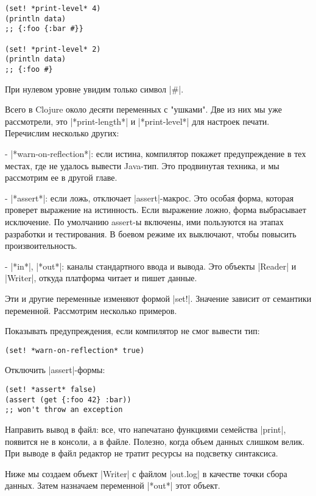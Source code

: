 \begin{verbatim}
(set! *print-level* 4)
(println data)
;; {:foo {:bar #}}

(set! *print-level* 2)
(println data)
;; {:foo #}
\end{verbatim}

При нулевом уровне увидим только символ \spverb|#|.

Всего в Clojure около десяти переменных с "ушками". Две из них мы уже
рассмотрели, это \spverb|*print-length*| и \spverb|*print-level*| для настроек
печати. Перечислим несколько других:

- \spverb|*warn-on-reflection*|: если истина, компилятор покажет предупреждение в тех
  местах, где не удалось вывести Java-тип. Это продвинутая техника, и мы
  рассмотрим ее в другой главе.

- \spverb|*assert*|: если ложь, отключает \spverb|assert|-макрос. Это особая форма, которая
  проверет выражение на истинность. Если выражение ложно, форма выбрасывает
  исключение. По умолчанию assert-ы включены, ими пользуются на этапах
  разработки и тестирования. В боевом режиме их выключают, чтобы повысить
  произвоительность.

- \spverb|*in*|, \spverb|*out*|: каналы стандартного ввода и вывода. Это объекты \spverb|Reader| и
  \spverb|Writer|, откуда платформа читает и пишет данные.

Эти и другие переменные изменяют формой \spverb|set!|. Значение зависит от семантики
переменной. Рассмотрим несколько примеров.

Показывать предупреждения, если компилятор не смог вывести тип:

\begin{verbatim}
(set! *warn-on-reflection* true)
\end{verbatim}

Отключить \spverb|assert|-формы:

\begin{verbatim}
(set! *assert* false)
(assert (get {:foo 42} :bar))
;; won't throw an exception
\end{verbatim}

Направить вывод в файл: все, что напечатано функциями семейства \spverb|print|,
появится не в консоли, а в файле. Полезно, когда объем данных слишком велик. При
выводе в файл редактор не тратит ресурсы на подсветку синтаксиса.

Ниже мы создаем объект \spverb|Writer| с файлом \spverb|out.log| в качестве точки сбора
данных. Затем назначаем переменной \spverb|*out*| этот объект.

